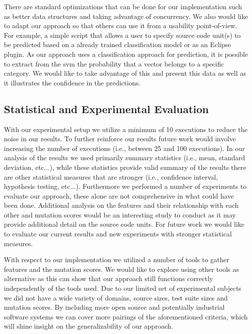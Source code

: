 There are standard optimizations that can be done for our implementation such as better data structures and taking advantage of concurrency. We also would like to adapt our approach so that others can use it from a usability point-of-view. For example, a simple script that allows a user to specify source code unit(s) to be predicted based on a already trained classification model or as an Eclipse plugin. As our approach uses a classification approach for prediction, it is possible to extract from the \gls{svm} the probability that a vector belongs to a specific category. We would like to take advantage of this and present this data as well as it illustrates the confidence in the predictions.


\subsection{Statistical and Experimental Evaluation}
\label{subsec:conclusions_experimental_evaluation}
With our experimental setup we utilize a minimum of 10 executions to reduce the noise in our results. To further reinforce our results future work would involve increasing the number of executions (i.e., between 25 and 100 executions). In our analysis of the results we used primarily summary statistics (i.e., mean, standard deviation, etc...), while these statistics provide valid summary of the results there are other statistical measures that are stronger (i.e., confidence interval, hypothesis testing, etc...). Furthermore we performed a number of experiments to evaluate our approach, these alone are not comprehensive in what could have been done. Additional analysis on the features and their relationship with each other and mutation scores would be an interesting study to conduct as it may provide additional detail on the source code units. For future work we would like to evaluate our current results and new experiments with stronger statistical measures.

With respect to our implementation we utilized a number of tools to gather features and the mutation scores. We would like to explore using other tools as alternative as this can show that our approach still functions correctly independently of the tools used. Due to our limited set of experimental subjects we did not have a wide variety of domains, source sizes, test suite sizes and mutation scores. By including more open source and potentially industrial software systems we can cover more pairings of the aforementioned criteria, which will shine insight on the generalizability of our approach.


